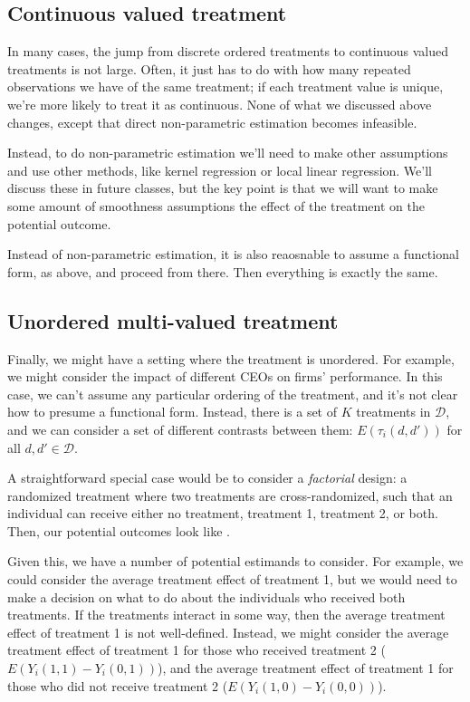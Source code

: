 \documentclass{tufte-handout}
\theoremstyle{break}
\begin{document}
\subsection{Continuous valued treatment}
In many cases, the jump from discrete ordered treatments to continuous valued treatments is not large. Often, it just has to do with how many repeated observations we have of the same treatment; if each treatment value is unique, we're more likely to treat it as continuous. None of what we discussed above changes, except that direct non-parametric estimation becomes infeasible. 

Instead, to do non-parametric estimation we'll need to make other assumptions and use other methods, like kernel regression or local linear regression. We'll discuss these in future classes, but the key point is that we will want to make some amount of smoothness assumptions the effect of the treatment on the potential outcome.

Instead of non-parametric estimation, it is also reaosnable to assume a functional form, as above, and proceed from there. Then everything is exactly the same. 

\subsection{Unordered multi-valued treatment}
Finally, we might have a setting where the treatment is unordered. For example, we might consider the impact of different CEOs on firms' performance. In this case, we can't assume any particular ordering of the treatment, and it's not clear how to presume a functional form. Instead, there is a set of $K$ treatments in $\mathcal{D}$, and we can consider a set of different contrasts between them: $E(\tau_{i}(d, d'))$ for all $d, d' \in \mathcal{D}$.

A straightforward special case would be to consider a \emph{factorial} design: a randomized treatment where two treatments are cross-randomized, such that an individual can receive either no treatment, treatment 1, treatment 2, or both. Then, our potential outcomes look like . 

Given this, we have a number of potential estimands to consider. For example, we could consider the average treatment effect of treatment 1, but we would need to make a decision on what to do about the individuals who received both treatments. If the treatments interact in some way, then the average treatment effect of treatment 1 is not well-defined. Instead, we might consider the average treatment effect of treatment 1 for those who received treatment 2 ($E(Y_{i}(1,1) - Y_{i}(0,1))$), and the average treatment effect of treatment 1 for those who did not receive treatment 2 ($E(Y_{i}(1,0) - Y_{i}(0,0))$). 
\end{document}
